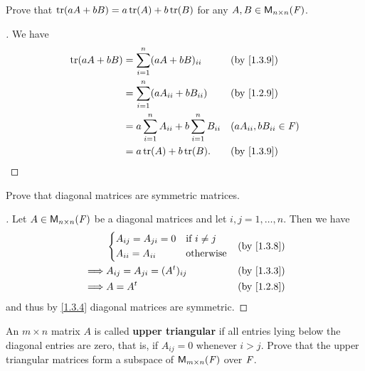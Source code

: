 \begin{ex}\label{ex:1.3.6}
  Prove that \(\tr[aA + bB] = a\tr[A] + b\tr[B]\) for any \(A, B \in \ms[n][n][\F]\).
\end{ex}

\begin{proof}[]
  We have
  \begin{align*}
    \tr[aA + bB] & = \sum_{i = 1}^n (aA + bB)_{i i}                      &  & \by{1.3.9}                  \\
                 & = \sum_{i = 1}^n (aA_{i i} + bB_{i i})                &  & \by{1.2.9}                  \\
                 & = a \sum_{i = 1}^n A_{i i} + b \sum_{i = 1}^n B_{i i} &  & (aA_{i i}, bB_{i i} \in \F) \\
                 & = a\tr[A] + b\tr[B].                                  &  & \by{1.3.9}
  \end{align*}
\end{proof}

\begin{ex}\label{ex:1.3.7}
  Prove that diagonal matrices are symmetric matrices.
\end{ex}

\begin{proof}[]
  Let \(A \in \ms[n][n][\F]\) be a diagonal matrices and let \(i, j = 1, \dots, n\).
  Then we have
  \begin{align*}
             & \begin{dcases}
                 A_{i j} = A_{j i} = 0 & \text{if } i \neq j \\
                 A_{i i} = A_{i i}     & \text{otherwise}
               \end{dcases} &  & \by{1.3.8}                    \\
    \implies & A_{i j} = A_{j i} = (\tp{A})_{i j}             &  & \by{1.3.3} \\
    \implies & A = \tp{A}                                     &  & \by{1.2.8}
  \end{align*}
  and thus by \cref{1.3.4} diagonal matrices are symmetric.
\end{proof}

\setcounter{ex}{11}
\begin{ex}\label{ex:1.3.12}
  An \(m \times n\) matrix \(A\) is called \textbf{upper triangular} if all entries lying below the diagonal entries are zero, that is, if \(A_{i j} = 0\) whenever \(i > j\).
  Prove that the upper triangular matrices form a subspace of \(\ms\) over \(\mathit{F}\).
\end{ex}

